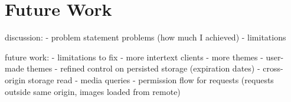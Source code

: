 
\section{Future Work} \label{futureWork}

discussion:
- problem statement problems (how much I achieved)
- limitations

future work:
- limitations to fix
- more intertext clients
- more themes
- user-made themes
- refined control on persisted storage (expiration dates)
- cross-origin storage read
- media queries
- permission flow for requests (requests outside same origin, images loaded from remote)